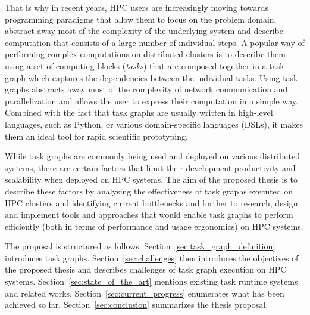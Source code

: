 That is why in recent years, HPC users are increasingly moving towards programming paradigms that
allow them to focus on the problem domain, abstract away most of the complexity of the underlying
system and describe computation that consists of a large number of individual steps.
A popular way of performing complex computations on distributed clusters is to describe them
using a set of computing blocks (\emph{tasks}) that are composed together in a task graph
which captures the dependencies between the individual tasks. Using task graphs abstracts away most
of the complexity of network communication and parallelization and allows the user to
express their computation in a simple way. Combined with the fact that task graphs are usually
written in high-level languages, such as Python, or various domain-specific languages (DSLs), it
makes them an ideal tool for rapid scientific prototyping.

While task graphs are commonly being used and deployed on various distributed systems, there are
certain factors that limit their development productivity and scalability when deployed on HPC
systems. The aim of the proposed thesis is to describe these factors by analysing the effectiveness
of task graphs executed on HPC clusters and identifying current bottlenecks and
further to research, design and implement tools and approaches that would enable task graphs to
perform efficiently (both in terms of performance and usage ergonomics) on HPC systems.

The proposal is structured as follows. Section~\ref{sec:task_graph_definition} introduces task
graphs. Section~\ref{sec:challenges} then introduces the objectives of the proposed
thesis and describes challenges of task graph execution on HPC systems.
Section~\ref{sec:state_of_the_art} mentions existing task runtime systems and related
works. Section~\ref{sec:current_progress} enumerates what has been achieved so far.
Section~\ref{sec:conclusion} summarizes the thesis proposal.
